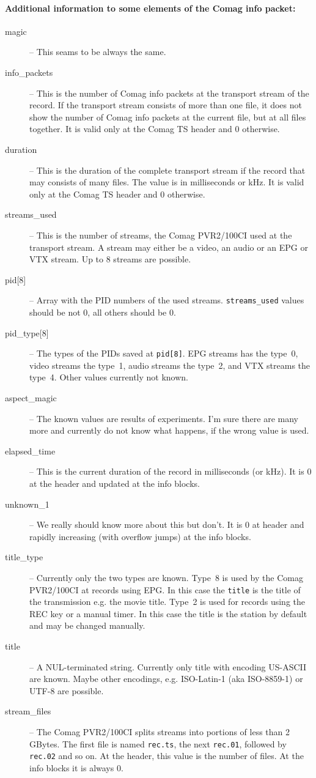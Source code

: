 \documentclass{scrartcl}
\newcommand*{\Comag}{Comag PVR2/100CI\xspace}
\begin{document}
\paragraph{Additional information to some elements of the Comag info packet:}
\begin{description}
\item[magic] -- This seams to be always the same.
\item[info\_packets] -- This is the number of Comag info packets at the
  transport stream of the record. If the transport stream consists of more
  than one file, it does not show the number of Comag info packets at the
  current file, but at all files together. It is valid only at the Comag TS
  header and 0 otherwise.
\item[duration] -- This is the duration of the complete transport stream if
  the record that may consists of many files. The value is in milliseconds or
  kHz.  It is valid only at the Comag TS header and 0 otherwise.
\item[streams\_used] -- This is the number of streams, the \Comag used at the
  transport stream. A stream may either be a video, an audio or an EPG or VTX
  stream. Up to 8 streams are possible.
\item[{pid[8]}] -- Array with the PID numbers of the used
  streams. \texttt{streams\_used} values should be not 0, all others should be
  0.
\item[{pid\_type[8]}] -- The types of the PIDs saved at \texttt{pid[8]}. EPG
  streams has the type~0, video streams the type~1, audio streams the type~2,
  and VTX streams the type~4. Other values currently not known.
\item[aspect\_magic] -- The known values are results of experiments. I'm sure
  there are many more and currently do not know what happens, if the wrong
  value is used.
\item[elapsed\_time] -- This is the current duration of the record in
  milliseconds (or kHz). It is 0 at the header and updated at the info blocks.
\item[unknown\_1] -- We really should know more about this but don't. It is 0
  at header and rapidly increasing (with overflow jumps) at the info blocks.
\item[title\_type] -- Currently only the two types are known. Type~8 is used
  by the \Comag at records using EPG. In this case the \texttt{title} is the
  title of the transmission e.g. the movie title. Type~2 is used for records
  using the REC key or a manual timer. In this case the title is the station
  by default and may be changed manually.
\item[title] -- A NUL-terminated string. Currently only title with encoding
  US-ASCII are known. Maybe other encodings, e.g. ISO-Latin-1 (aka ISO-8859-1)
  or UTF-8 are possible.
\item[stream\_files] -- The \Comag splits streams into portions of less than
  2\,GBytes. The first file is named \texttt{rec.ts}, the next
  \texttt{rec.01}, followed by \texttt{rec.02} and so on. At the header, this
  value is the number of files. At the info blocks it is always 0.
\end{description}
\end{document}

